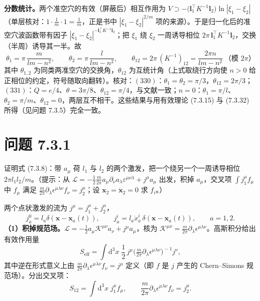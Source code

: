 \textbf{分数统计。}两个准空穴的有效（屏蔽后）相互作用为 $V\supset-\big(\pmb{l}_1^{\top}K^{-1}\pmb{l}_2\big)\ln|\xi_1-\xi_2|$（单层核对：$1\cdot\frac{1}{m}\cdot1=\frac1m$，正是书中 $|\xi_1-\xi_2|^{2/m}$ 项的来源）。于是归一化后的准空穴波函数带有因子 $|\xi_1-\xi_2|^{-\pmb{l}_1^{\top}K^{-1}\pmb{l}_2}$；把 $\xi_1$ 绕 $\xi_2$ 一周诱导相位 $2\pi\,\pmb{l}_1^{\top}K^{-1}\pmb{l}_2$，交换（半周）诱导其一半。故
\begin{equation*}
\boxed{\;\theta_1=\pi\,\frac{m}{lm-n^2},
\qquad
\theta_2=\pi\,\frac{l}{lm-n^2},\qquad
\theta_{12}=2\pi\,(K^{-1})_{12}=\frac{2\pi n}{lm-n^2}\ \text{（模 }2\pi\text{）}\;}
\end{equation*}
其中 $\theta_{1,2}$ 为同类两准空穴的交换角，$\theta_{12}$ 为互统计角（上式取绕行方向使 $n>0$ 给正相位的约定，符号随取向翻转）。核对：$(330)$：$\theta_1=\theta_2=\pi/3$，$\theta_{12}=2\pi/3$；$(331)$：$Q=e/4$、$\theta=3\pi/8$、$\theta_{12}=\pi/4$，与文献一致；$n=0$：$\theta_1=\pi/l$、$\theta_2=\pi/m$、$\theta_{12}=0$，两层互不相干。这些结果与用有效理论 (7.3.15) 与 (7.3.32) 所得（见问题 7.3.5）完全一致。

\section*{问题 7.3.1}
\begin{problem}
证明式 (7.3.8)：带 $a_\mu$ 荷 $l_1$ 与 $l_2$ 的两个激发，把一个绕另一个一周诱导相位 $2\pi l_1l_2/m$。（提示：从 $\mathcal{L}=-\frac12\frac{m}{2\pi}a_\mu\partial_\nu a_\lambda\varepsilon^{\mu\nu\lambda}+j^\mu a_\mu$ 出发，积掉 $a_\mu$，交叉项 $\int j_1^\mu f_\mu$ 中 $f_\mu$ 满足 $\frac{m}{2\pi}\partial_\lambda\epsilon^{\mu\lambda\nu}f_\nu=j_2^\mu$；设 $\pmb{x}_2=\dot{\pmb{x}}_2=0$ 求 $f_i$。）
\end{problem}
\solution
两个点状激发的流为 $j^\mu=j_1^\mu+j_2^\mu$，
\begin{equation*}
j_a^0=l_a\delta(\pmb{x}-\pmb{x}_a(t)),\qquad
j_a^i=l_a\dot{x}_a^i\,\delta(\pmb{x}-\pmb{x}_a(t)),
\qquad a=1,2 .
\end{equation*}
\textbf{（1）积掉规范场。}$\mathcal{L}=-\frac12a_\mu\mathcal{K}^{\mu\nu}a_\nu+j^\mu a_\mu$，核为 $\mathcal{K}^{\mu\nu}=\frac{m}{2\pi}\partial_\lambda\epsilon^{\mu\lambda\nu}$。高斯积分给出有效作用量
\begin{equation*}
S_{\text{eff}}=\int\mathrm{d}^3x\;\frac12\,j^\mu
\Big(\tfrac{m}{2\pi}\partial_\lambda\epsilon^{\mu\lambda\nu}\Big)^{\!-1}j^\nu ,
\end{equation*}
其中逆在形式意义上由 $\frac{m}{2\pi}\partial_\lambda\epsilon^{\mu\lambda\nu}f_\nu=j^\mu$ 定义（即 $f$ 是 $j$ 产生的 Chern--Simons 规范场）。分出交叉项：
\begin{equation*}
S_{12}=\int\mathrm{d}^3x\;j_1^\mu f_\mu ,
\qquad
\frac{m}{2\pi}\partial_\lambda\epsilon^{\mu\lambda\nu}f_\nu=j_2^\mu .
\end{equation*}

